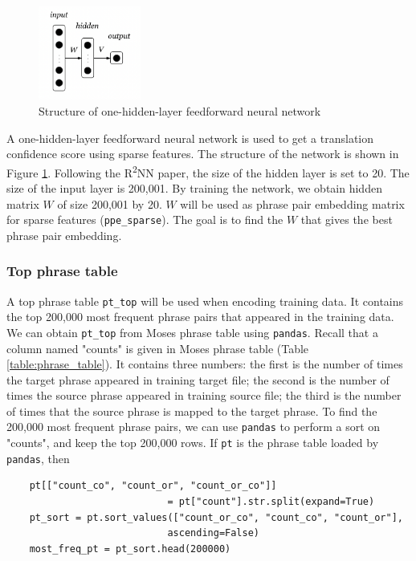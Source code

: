 \documentclass[12pt,a4paper,twoside,openright]{report}
\begin{document}
\begin{figure}[ht]
\centering
\includegraphics[width=0.3\textwidth]{images/one_hidden_layer.png}
\caption{Structure of one-hidden-layer feedforward neural network}
\label{fig:one_hidden_layer}
\end{figure}

A one-hidden-layer feedforward neural network is used to get a translation confidence score using sparse features. The structure of the network is shown in Figure \ref{fig:one_hidden_layer}. Following the R\textsuperscript{2}NN paper\cite{r2nn}, the size of the hidden layer is set to 20. The size of the input layer is 200,001. By training the network, we obtain hidden matrix $W$ of size 200,001 by 20. $W$ will be used as phrase pair embedding matrix for sparse features (\texttt{ppe\_sparse}). The goal is to find the $W$ that gives the best phrase pair embedding.

\subsubsection{Top phrase table}
A top phrase table \texttt{pt\_top} will be used when encoding training data. It contains the top 200,000 most frequent phrase pairs that appeared in the training data. We can obtain \texttt{pt\_top} from Moses phrase table using \texttt{pandas}. Recall that a column named "counts" is given in Moses phrase table (Table \ref{table:phrase_table}). It contains three numbers: the first is the number of times the target phrase appeared in training target file; the second is the number of times the source phrase appeared in training source file; the third is the number of times that the source phrase is mapped to the target phrase. To find the 200,000 most frequent phrase pairs, we can use \texttt{pandas} to perform a sort on "counts", and keep the top 200,000 rows. If \texttt{pt} is the phrase table loaded by \texttt{pandas}, then

\begin{verbatim}
    pt[["count_co", "count_or", "count_or_co"]] 
                            = pt["count"].str.split(expand=True)
    pt_sort = pt.sort_values(["count_or_co", "count_co", "count_or"], 
                            ascending=False)
    most_freq_pt = pt_sort.head(200000)
\end{verbatim}
\end{document}
